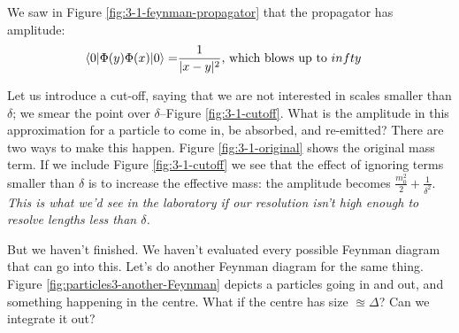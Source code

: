 \documentclass[]{article}
\begin{document}
We saw in Figure \ref{fig:3-1-feynman-propagator} that the propagator has amplitude:
\begin{align*}
	\braket{0|\Phi(y)\Phi(x)|0}=&\frac{1}{|x-y|^2}\text{, which blows up to $infty$}
\end{align*}

Let us introduce a cut-off, saying that we are not interested in scales smaller than $\delta$; we smear the point over $\delta$--Figure \ref{fig:3-1-cutoff}. What is the amplitude in this approximation for a particle to come in, be absorbed, and re-emitted? There are two ways to make this happen. Figure \ref{fig:3-1-original} shows the original mass term. If we include Figure \ref{fig:3-1-cutoff} we see that the effect of ignoring terms smaller than $\delta$ is to increase the effective mass: the amplitude becomes $\frac{m_0^2}{2}+\frac{1}{\delta^2}$.  \emph{This is what we'd see in the laboratory if our resolution isn't high enough to resolve lengths less than $\delta$.}  

But we haven't finished. We haven't evaluated every possible Feynman diagram that can go into this. Let's do another Feynman diagram for the same thing. Figure \ref{fig:particles3-another-Feynman} depicts a particles going in and out, and something happening in the centre. What if the centre has size $\approxeq \Delta$? Can we integrate it out?
\end{document}
